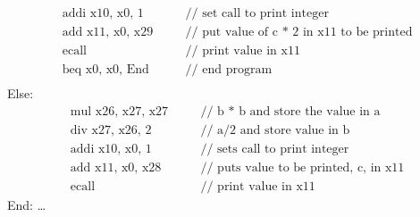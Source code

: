 \documentclass[12pt]{article}
\begin{document}
\begin{enumerate}
\begin{align*}
                &\text{addi x10, x0, 1}\quad &&\text{// set call to print integer} \\
                &\text{add x11, x0, x29}\quad &&\text{// put value of c * 2 in x11 to be printed} \\
                &\text{ecall}\quad &&\text{// print value in x11} \\
                &\text{beq x0, x0, End}\quad &&\text{// end program} \\
            \end{align*}
            Else:
            \begin{align*}
                &\text{mul x26, x27, x27}\quad &&\text{// b * b and store the value in a} \\
                &\text{div x27, x26, 2}\quad &&\text{// a/2 and store value in b} \\
                &\text{addi x10, x0, 1}\quad &&\text{// sets call to print integer} \\
                &\text{add x11, x0, x28}\quad &&\text{// puts value to be printed, c, in x11} \\
                &\text{ecall}\quad &&\text{// print value in x11}
            \end{align*}
            End: \ldots
    \end{enumerate}
\end{document}
